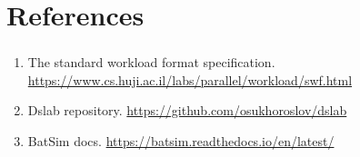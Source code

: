 \documentclass[t]{beamer}  %
\begin{document}
	\section{References}
	\begin{frame}
		\frametitle{\insertsection} 
		\framesubtitle{\insertsubsection}
		\vspace{1cm}	
		\begin{enumerate}
			\item The standard workload format specification. \url{https://www.cs.huji.ac.il/labs/parallel/workload/swf.html}
			\item Dslab repository. \url{https://github.com/osukhoroslov/dslab}
			\item BatSim docs. \url{https://batsim.readthedocs.io/en/latest/}
		\end{enumerate}
	\end{frame}
\end{document}
